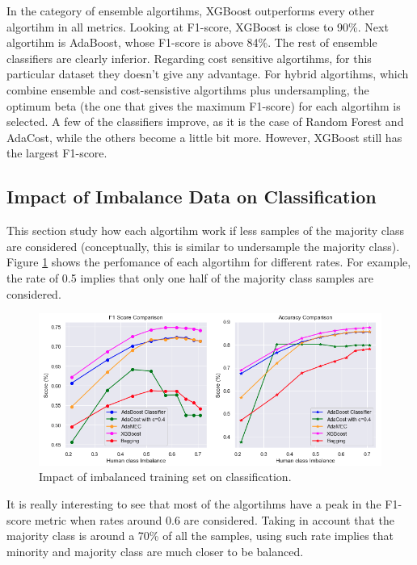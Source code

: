 \documentclass[conference]{IEEEtran}
\begin{document}
In the category of ensemble algortihms, XGBoost outperforms every other algortihm in all metrics. Looking at F1-score, XGBoost is close to 90\%. Next algortihm is AdaBoost, whose F1-score is above 84\%. The rest of ensemble classifiers are clearly inferior. Regarding cost sensitive algortihms, for this particular dataset they doesn't give any advantage. For hybrid algortihms, which combine ensemble and cost-sensistive algortihms plus undersampling, the optimum beta (the one that gives the maximum F1-score) for each algortihm is selected. A few of the classifiers improve, as it is the case of Random Forest and AdaCost, while the others become a little bit more. However, XGBoost still has the largest F1-score. 

\subsection{Impact of Imbalance Data on Classification}

This section study how each algortihm work if less samples of the majority class are considered (conceptually, this is similar to undersample the majority class). Figure \ref{Fig:ImbalanceComparison} shows the perfomance of each algortihm for different rates. For example, the rate of 0.5 implies that only one half of the majority class samples are considered. 

\begin{figure}[htbp]
\centerline{\includegraphics[scale=0.35]{pictures/Imbalance_Comparison1.png}}
\caption{Impact of imbalanced training set on classification.}
\label{Fig:ImbalanceComparison}
\end{figure}

It is really interesting to see that most of the algortihms have a peak in the F1-score metric when rates around 0.6 are considered. Taking in account that the majority class is around a 70\% of all the samples, using such rate implies that minority and majority class are much closer to be balanced. 
\end{document}
